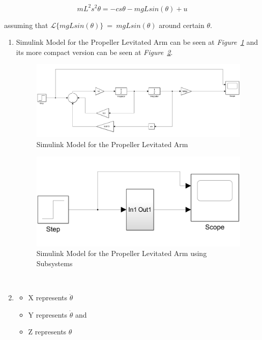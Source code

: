 \documentclass[a4paper,12pt]{article}
\begin{document}
\begin{enumerate}
	$$	mL^2s^2\theta=-cs\theta-mgLsin(\theta)+u	$$

	assuming that $ \mathcal{L}\{mgLsin(\theta)\}~=~mgLsin(\theta)	$ around certain $\theta$.
	
	
		\begin{enumerate}
			\item Simulink Model for the Propeller Levitated Arm can be seen at \textit{Figure~\ref{fig:2a}} and its more compact version can be seen at \textit{Figure~\ref{fig:2a2}}.
			
				\begin{figure}[H]
					\center
					\setlength{\unitlength}{\textwidth} 
					\includegraphics[width=0.8\unitlength]{images/2a}
					\caption{\label{fig:2a} Simulink Model for the Propeller Levitated Arm }
				\end{figure} 
				
				\begin{figure}[H]
					\center
					\setlength{\unitlength}{\textwidth} 
					\includegraphics[width=0.8\unitlength]{images/2a2}
					\caption{\label{fig:2a2} Simulink Model for the Propeller Levitated Arm using Subsystems}
				\end{figure} 

			
			\-\\
			\item  
				\begin{itemize}
					\item X represents $\ddot{\theta}$ 
					\item Y represents $\dot{\theta}$ and 
					\item Z represents $\theta$	
				\end{itemize}							
			

\end{enumerate}
\end{enumerate}
\end{document}
